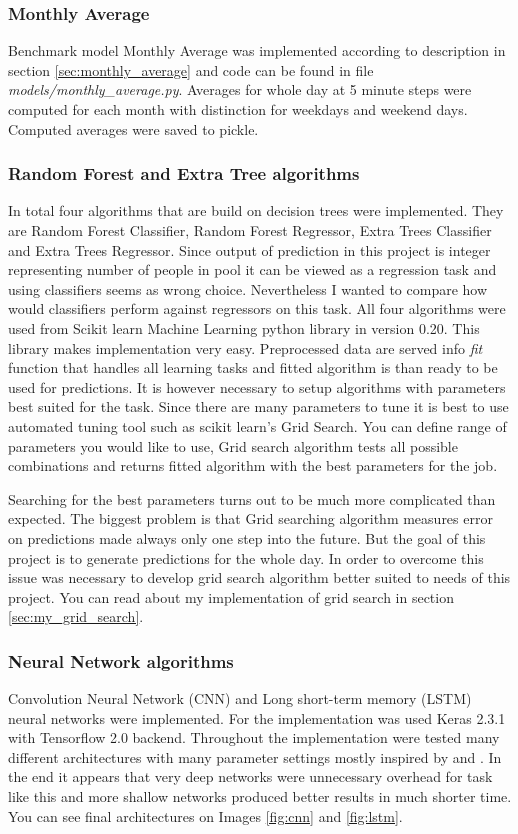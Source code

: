 \documentclass{article}
\begin{document}
\subsubsection{Monthly Average}
Benchmark model Monthly Average was implemented according to description in section \ref{sec:monthly_average} and code can be found in file \emph{models/monthly\_average.py}. Averages for whole day at 5 minute steps were computed for each month with distinction for weekdays and weekend days. Computed averages were saved to pickle.
 
\subsubsection{Random Forest and Extra Tree algorithms}
In total four algorithms that are build on decision trees were implemented. They are Random Forest Classifier, Random Forest Regressor, Extra Trees Classifier and Extra Trees Regressor. Since output of prediction in this project is integer representing number of people in pool it can be viewed as a regression task and using classifiers seems as wrong choice. Nevertheless I wanted to compare how would classifiers perform against regressors on this task. All four algorithms were used from Scikit learn Machine Learning python library in version 0.20. This library makes implementation very easy. Preprocessed data are served info \emph{fit} function that handles all learning tasks and fitted algorithm is than ready to be used for predictions. It is however necessary to setup algorithms with parameters best suited for the task. Since there are many parameters to tune it is best to use automated tuning tool such as scikit learn's Grid Search. You can define range of parameters you would like to use, Grid search algorithm tests all possible combinations and returns fitted algorithm with the best parameters for the job. 

Searching for the best parameters turns out to be much more complicated than expected. The biggest problem is that Grid searching algorithm measures error on predictions made always only one step into the future. But the goal of this project is to generate predictions for the whole day. In order to overcome this issue was necessary to develop grid search algorithm better suited to needs of this project. You can read about my implementation of grid search in section \ref{sec:my_grid_search}. 


\subsubsection{Neural Network algorithms} \label{sec:cnn_implementation}
Convolution Neural Network (CNN) and Long short-term memory (LSTM) neural networks were implemented. For the implementation was used Keras 2.3.1 with Tensorflow 2.0 backend. Throughout the implementation were tested many different architectures with many parameter settings mostly inspired by \citep{brownlee2019cnn} and \citep{brownlee2019lstm}. In the end it appears that very deep networks were unnecessary overhead for task like this and more shallow networks produced better results in much shorter time. You can see final architectures on Images \ref{fig:cnn} and \ref{fig:lstm}.
\end{document}
